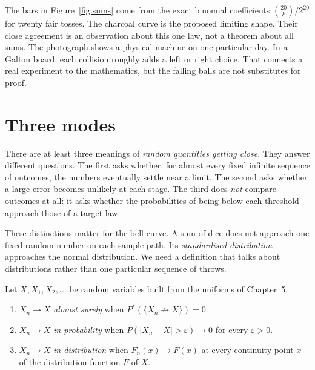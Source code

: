 
The bars in Figure~\ref{fig:sums} come from the exact binomial coefficients $\binom{20}{k}/2^{20}$ for twenty fair tosses. The charcoal curve is the proposed limiting shape. Their close agreement is an observation about this one law, not a theorem about all sums. The photograph shows a physical machine on one particular day. In a Galton board, each collision roughly adds a left or right choice. That connects a real experiment to the mathematics, but the falling balls are not substitutes for proof.

\section{Three modes}

There are at least three meanings of \emph{random quantities getting close}. They answer different questions. The first asks whether, for almost every fixed infinite sequence of outcomes, the numbers eventually settle near a limit. The second asks whether a large error becomes unlikely at each stage. The third does \emph{not} compare outcomes at all: it asks whether the probabilities of being below each threshold approach those of a target law.

These distinctions matter for the bell curve. A sum of dice does not approach one fixed random number on each sample path. Its \emph{standardised distribution} approaches the normal distribution. We need a definition that talks about distributions rather than one particular sequence of throws.

\begin{definition}\label{def:modes}
Let $X,X_1,X_2,\ldots$ be random variables built from the uniforms of Chapter~5.
\begin{enumerate}[label=(\alph*)]
\item $X_n\to X$ \emph{almost surely} when $P^*(\{X_n\not\to X\})=0$.
\item $X_n\to X$ \emph{in probability} when $P(|X_n-X|>\varepsilon)\to0$ for every $\varepsilon>0$.
\item $X_n\to X$ \emph{in distribution} when $F_n(x)\to F(x)$ at every continuity point $x$ of the distribution function $F$ of $X$.
\end{enumerate}
\end{definition}

